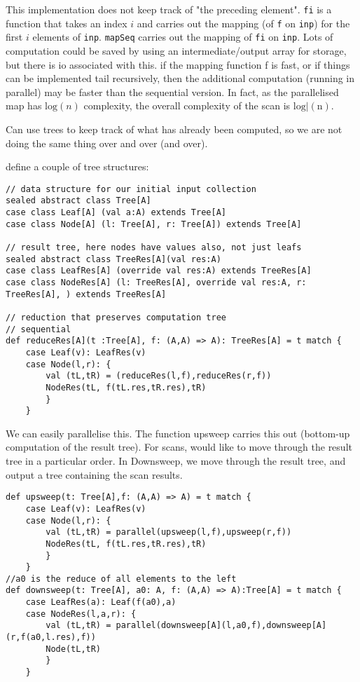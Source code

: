 This implementation does not keep track of "the preceding element". \lstinline|fi| is a function that takes an index $i$ and carries out the mapping (of \lstinline|f| on \lstinline|inp|) for the first $i$ elements of \lstinline|inp|. \lstinline|mapSeq| carries out the mapping of \lstinline|fi| on \lstinline|inp|. Lots of computation could be saved by using an intermediate/output array for storage, but there is io associated with this. if the mapping function f is fast, or if things can be implemented tail recursively, then the additional computation (running in parallel) may be faster than the sequential version. In fact, as the parallelised map has $\mathrm{log}(n)$ complexity, the overall complexity of the scan is $\mathrm{log|(n)}$.

Can use trees to keep track of what has already been computed, so we are not doing the same thing over and over (and over).

define a couple of tree structures:
\begin{lstlisting}
// data structure for our initial input collection
sealed abstract class Tree[A]
case class Leaf[A] (val a:A) extends Tree[A]
case class Node[A] (l: Tree[A], r: Tree[A]) extends Tree[A]

// result tree, here nodes have values also, not just leafs
sealed abstract class TreeRes[A](val res:A)
case class LeafRes[A] (override val res:A) extends TreeRes[A]
case class NodeRes[A] (l: TreeRes[A], override val res:A, r: TreeRes[A], ) extends TreeRes[A]

// reduction that preserves computation tree
// sequential
def reduceRes[A](t :Tree[A], f: (A,A) => A): TreeRes[A] = t match {
    case Leaf(v): LeafRes(v)
    case Node(l,r): {
        val (tL,tR) = (reduceRes(l,f),reduceRes(r,f))
        NodeRes(tL, f(tL.res,tR.res),tR)
        }
    }
\end{lstlisting}

We can easily parallelise this. The function upsweep carries this out (bottom-up computation of the result tree). For scans, would like to move through the result tree in a particular order. In Downsweep, we move through the result tree, and output a tree containing the scan results.

\begin{lstlisting}
def upsweep(t: Tree[A],f: (A,A) => A) = t match {
    case Leaf(v): LeafRes(v)
    case Node(l,r): {
        val (tL,tR) = parallel(upsweep(l,f),upsweep(r,f))
        NodeRes(tL, f(tL.res,tR.res),tR)
        }
    }
//a0 is the reduce of all elements to the left
def downsweep(t: Tree[A], a0: A, f: (A,A) => A):Tree[A] = t match {
    case LeafRes(a): Leaf(f(a0),a)
    case NodeRes(l,a,r): {
        val (tL,tR) = parallel(downsweep[A](l,a0,f),downsweep[A](r,f(a0,l.res),f))
        Node(tL,tR)
        }
    }

\end{lstlisting}

